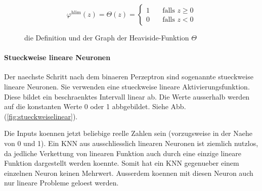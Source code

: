 \documentclass[../main]{subfiles}
\begin{document}
\begin{figure}[h!]
  \begin{minipage}[h!]{0.5\textwidth}
    \begin{equation*}
      \varphi^{\text{hlim}}(z) = \Theta(z) =
      \begin{cases}
        1 & \quad \text{falls } z \geq 0\\
        0 & \quad \text{falls } z < 0
      \end{cases}
    \end{equation*}

  \end{minipage}
  \begin{minipage}[h!]{0.5\textwidth}
    \centering
  \end{minipage}

  \caption{die Definition und der Graph der Heaviside-Funktion $\Theta$}
  \label{fig:heaviside}
\end{figure}

\paragraph{Stueckweise lineare Neuronen}
Der naechste Schritt nach dem binaeren Perzeptron sind sogenannte stueckweise
lineare Neuronen.
Sie verwenden eine stueckweise lineare Aktivierungsfunktion. Diese bildet ein
beschraenktes Intervall linear ab. Die Werte ausserhalb werden auf die
konstanten Werte 0 oder 1 abbgebildet. Siehe Abb. (\ref{fig:stueckweiselinear}).
\par\medskip
Die Inputs koennen jetzt beliebige reelle Zahlen sein (vorzugsweise in der Naehe
von 0 und 1).
Ein KNN aus ausschliesslich linearen Neuronen ist ziemlich nutzlos, da jedliche Verkettung von
linearen Funktion auch durch eine einzige lineare Funktion dargestellt werden
koennte. Somit hat ein KNN gegenueber einem einzelnen Neuron keinen Mehrwert.
Ausserdem koennen mit diesen Neuron auch nur lineare Probleme geloest werden.
\end{document}
